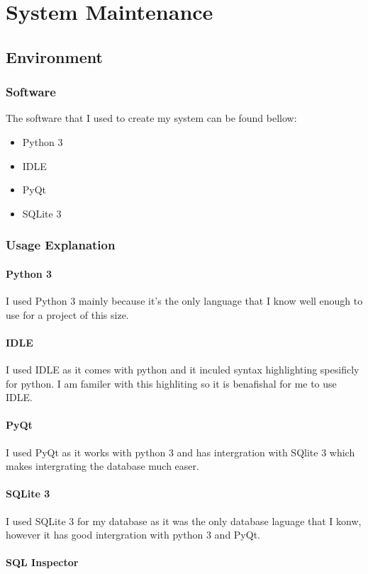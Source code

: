 \chapter{System Maintenance}
\section{Environment}
\subsection{Software}
The software that I used to create my system can be found bellow:

\begin{itemize}
\item Python 3
\item IDLE
\item PyQt
\item SQLite 3
\end{itemize}
\subsection{Usage Explanation}
\subsubsection{Python 3}
I used Python 3 mainly because it's the only language that I know well enough to use for a project of this size.
\subsubsection{IDLE}
I used IDLE as it comes with python and it inculed syntax highlighting spesificly for python. I am familer with this highliting so it is benafishal for me to use IDLE.
\subsubsection{PyQt}
I used PyQt as it works with python 3 and has intergration with SQlite 3 which makes intergrating the database much easer.
\subsubsection{SQLite 3}
I used SQLite 3 for my database as it was the only database laguage that I konw, however it has good intergration with python 3 and PyQt.
\subsubsection{SQL Inspector}


